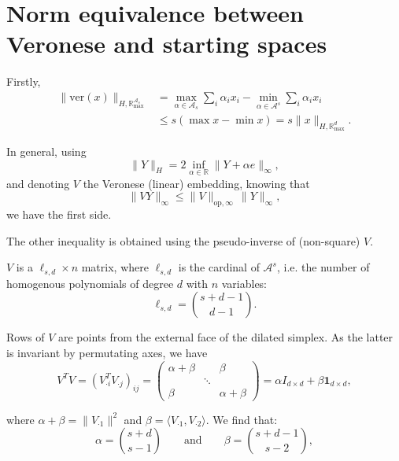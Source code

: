\documentclass[oneside,UKenglish,a4paper]{amsart}
\numberwithin{equation}{section}
\numberwithin{figure}{section}
\theoremstyle{plain}
\theoremstyle{definition}
\theoremstyle{plain}
\theoremstyle{remark}
\theoremstyle{plain}
\theoremstyle{definition}
\theoremstyle{definition}
\begin{document}
\appendix
\section{Norm equivalence between Veronese and starting spaces}\label{appendix:NormEquivalence}
Firstly,
\begin{align*}
\lVert\text{ver}(x)\rVert_{H,\mathbb{R}^{\mathcal{A}_s}_{\max}}&=\max_{\alpha\in\mathcal{A}_{s}}\sum_{i}\alpha_{i}x_{i}-\min_{\alpha\in\mathcal{A}^{s}}\sum_{i}\alpha_{i}x_{i}\\&\le s(\max x-\min x)=s\lVert x\rVert_{H,\mathbb{R}_{\max}^d}.
\end{align*}

In general, using
\[
\lVert Y\rVert_{H}=2\inf_{\alpha\in\mathbb{R}}\lVert Y+\alpha e\rVert_{\infty},
\]
and denoting $V$ the Veronese (linear) embedding, knowing that
\[
\lVert VY\rVert_{\infty}\le \lVert V\rVert_{\text{op},\infty} \, \lVert Y \rVert_\infty,
\]
we have the first side.

The other inequality is obtained using the pseudo-inverse of (non-square) $V$.

$V$ is a $\ell_{s,d}\times n$ matrix, where $\ell_{s,d}$ is the
cardinal of $\mathcal{A}^{s}$, i.e. the number of homogenous polynomials
of degree $d$ with $n$ variables:
\[
\ell_{s,d}=\binom{s+d-1}{d-1}.
\]

Rows of $V$ are points from the external face of the dilated simplex.
As the latter is invariant by permutating axes, we have
\[
V^{T}V=(V_{\cdot i}^{T}V_{\cdot j})_{ij}=\begin{pmatrix}\alpha+\beta &  & \beta\\
 & \ddots\\
\beta &  & \alpha+\beta
\end{pmatrix}=\alpha I_{d\times d}+\beta\mathbf{1}_{d\times d},
\]

where $\alpha+\beta=\lVert V_{\cdot1}\rVert^{2}$ and $\beta=\langle V_{\cdot1},V_{\cdot2}\rangle$. We find that:
\[
\alpha=\binom{s+d}{s-1}\qquad\text{and}\qquad\beta=\binom{s+d-1}{s-2},
\]

\end{document}
